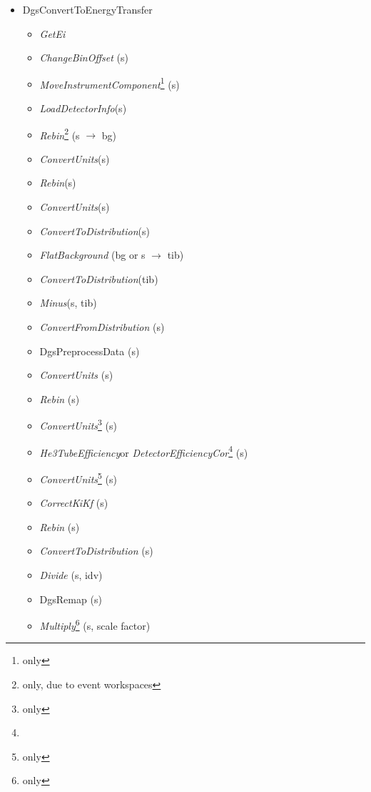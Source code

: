 \begin{itemize}
\item DgsConvertToEnergyTransfer
\begin{itemize}
\item \textit{GetEi}
\item \textit{ChangeBinOffset} (s)
\item \textit{MoveInstrumentComponent}\footnote{\isis{} only} (s)
\item \textit{LoadDetectorInfo}\footnotemark[\value{footnote}] (s)
\item \textit{Rebin}\footnote{\sns{} only, due to event workspaces} (s $\rightarrow$ bg)
\item \textit{ConvertUnits}\footnotemark[\value{footnote}] (s)
\item \textit{Rebin}\footnotemark[\value{footnote}] (s)
\item \textit{ConvertUnits}\footnotemark[\value{footnote}] (s)
\item \textit{ConvertToDistribution}\footnotemark[\value{footnote}] (s)
\item \textit{FlatBackground} (bg or s $\rightarrow$ tib)
\item \textit{ConvertToDistribution}\footnotemark[\value{footnote}] (tib)
\item \textit{Minus}\footnotemark[\value{footnote}] (s, tib)
\item \textit{ConvertFromDistribution} (s)
\item DgsPreprocessData (s)
\item \textit{ConvertUnits} (s)
\item \textit{Rebin} (s)
\item \textit{ConvertUnits}\footnote{\sns{} only} (s)
\item \textit{He3TubeEfficiency}\footnotemark[\value{footnote}] or \textit{DetectorEfficiencyCor}\footnote{\isis{}} (s)
\item \textit{ConvertUnits}\footnote{\sns{} only} (s)
\item \textit{CorrectKiKf} (s)
\item \textit{Rebin} (s)
\item \textit{ConvertToDistribution} (s)
\item \textit{Divide} (s, idv)
\item DgsRemap (s)
\item \textit{Multiply}\footnote{\isis{} only} (s, scale factor)
\end{itemize}
\end{itemize}

